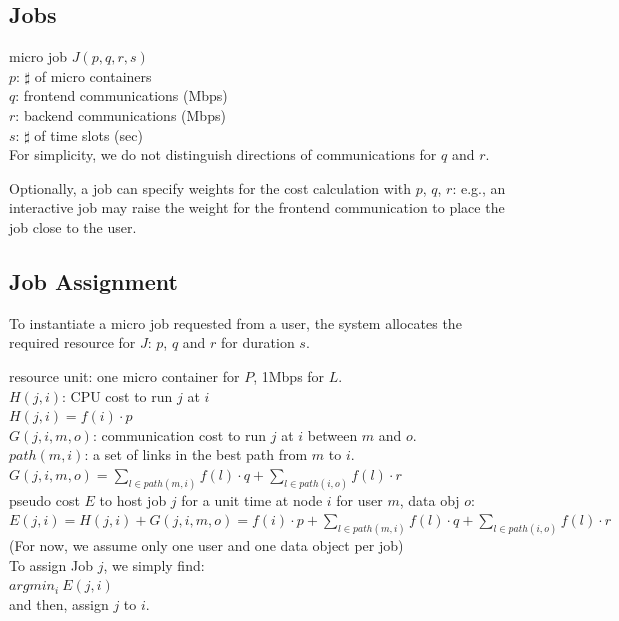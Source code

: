 \subsection{Jobs}

micro job $J(p, q, r, s)$	\\
$p$: $\sharp$ of micro containers	\\
$q$: frontend communications (Mbps)	\\
$r$: backend communications (Mbps)	\\
$s$: $\sharp$ of time slots (sec)	\\

For simplicity, we do not distinguish directions of communications for $q$ and $r$.

Optionally, a job can specify weights for the cost calculation with $p$, $q$, $r$:
e.g., an interactive job may raise the weight for the frontend
communication to place the job close to the user.

\subsection{Job Assignment}

To instantiate a micro job requested from a user, the system allocates
the required resource for $J$: $p$, $q$ and $r$ for duration $s$.



resource unit: one micro container for $P$, 1Mbps for $L$. \\
$H(j, i)$: CPU cost to run $j$ at $i$ \\
\( H(j, i) = f(i) \cdot p \)	\\
$G(j, i, m, o)$: communication cost to run $j$ at $i$ between $m$ and $o$. \\
$path(m,i)$: a set of links in the best path from $m$ to $i$. \\
\( G(j, i, m, o) = \sum_{l \in path(m,i)} f(l) \cdot q + \sum_{l \in path(i,o)} f(l) \cdot r \) \\
pseudo cost $E$ to host job $j$ for a unit time at node $i$ for user $m$, data obj $o$: \\
\( E(j, i)  =  H(j,i) + G(j,i,m,o) =  f(i) \cdot p + \sum_{l \in path(m,i)} f(l) \cdot q + \sum_{l \in path(i,o)} f(l) \cdot r \) \\
(For now, we assume only one user and one data object per job) \\
To assign Job $j$, we simply find: \\
\(  argmin_{i} \: E(j, i)   \)  \\
and then, assign $j$ to $i$. \\


